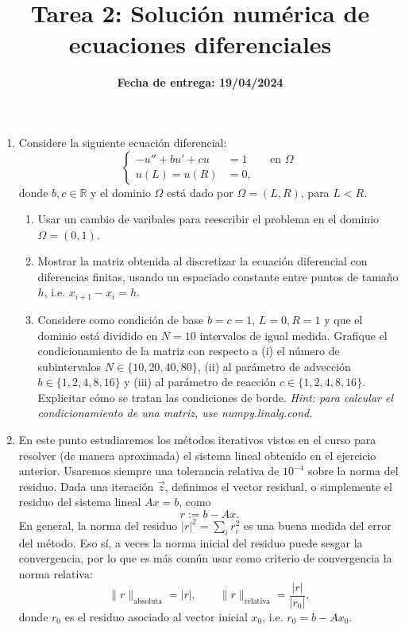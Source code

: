 \documentclass{article}
\title{Tarea 2: Solución numérica de ecuaciones diferenciales}
\date{\textbf{Fecha de entrega: 19/04/2024}}
\begin{document}
\maketitle

\begin{enumerate}
    \item Considere la siguiente ecuación diferencial: 
        $$
            \left\lbrace\begin{aligned}
                - u'' + b u' + c u &= 1 && \text{en $\Omega$}\\
                u(L) = u(R) &= 0,
            \end{aligned}\right.
        $$
        donde $b,c\in \mathbb R$ y el dominio $\Omega$ está dado por $\Omega = (L, R)$, para $ L < R$. 
        \begin{enumerate}
            \item Usar un cambio de varibales para reescribir el problema en el dominio $\Omega = (0,1)$.
            \item Mostrar la matriz obtenida al discretizar la ecuación diferencial con diferencias finitas, usando un espaciado constante entre puntos de tamaño $h$, i.e. $x_{i+1} - x_i = h$.
            \item Considere como condición de base $b=c=1$, $L=0, R=1$ y que el dominio está dividido en $N=10$ intervalos de igual medida. Grafique el condicionamiento de la matriz con respecto a (i) el número de subintervalos $N\in \{10,20,40,80\}$, (ii) al parámetro de advección $b \in\{1, 2, 4, 8, 16\}$ y (iii) al parámetro de reacción $c\in\{1, 2, 4, 8, 16\}$. Explicitar cómo se tratan las condiciones de borde. \textit{Hint: para calcular el condicionamiento de una matriz, use numpy.linalg.cond.}
        \end{enumerate} 

    \item En este punto estudiaremos los métodos iterativos vistos en el curso para resolver (de manera aproximada) el sistema lineal obtenido en el ejercicio anterior. Usaremos siempre una tolerancia relativa de $10^{-4}$ sobre la norma del residuo. Dada una iteración $\vec z$, definimos el vector residual, o simplemente el residuo del sistema lineal $Ax = b$, como 
            $$ r := b - Ax. $$
    En general, la norma del residuo $|r|^2 = \sum_i r_i^2$ es una buena medida del error del método. Eso sí, a veces la norma inicial del residuo puede sesgar la convergencia, por lo que es más común usar como criterio de convergencia la norma relativa: 
        $$ \|r\|_\text{absoluta} = |r|, \qquad \|r\|_\text{relativa} = \frac{|r|}{|r_0|}, $$
    donde $r_0$ es el residuo asociado al vector inicial $x_0$, i.e. $r_0 = b - Ax_0$. 


\end{enumerate}
\end{document}
